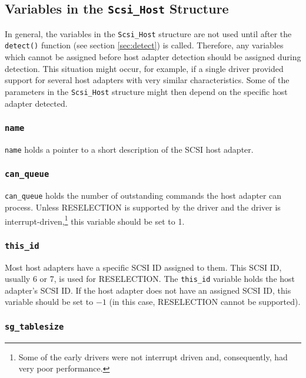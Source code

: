 \subsection{Variables in the {\tt Scsi\_Host} Structure}

In general, the variables in the \verb|Scsi_Host| structure are not used
until after the \verb|detect()| function (see section \ref{sec:detect}) is
called.  Therefore, any variables which cannot be assigned before host
adapter detection should be assigned during detection.  This situation
might occur, for example, if a single driver provided support for several
host adapters with very similar characteristics.  Some of the parameters in
the \verb|Scsi_Host| structure might then depend on the specific host
adapter detected.


\subsubsection{{\tt name}}

\verb|name| holds a pointer to a short description of the SCSI host adapter.


\subsubsection{{\tt can\_queue}}
\label{sec:can.queue}

\verb|can_queue| holds the number of outstanding commands the host adapter
can process.  Unless RESELECTION is supported by the driver and the driver
is interrupt-driven,\footnote{Some of the early \Linux{} drivers were not
  interrupt driven and, consequently, had very poor performance.} this
variable should be set to 1.

\subsubsection{{\tt this\_id}}

Most host adapters have a specific SCSI ID assigned to them.  This SCSI ID,
usually 6 or 7, is used for RESELECTION\@.  The \verb|this_id| variable
holds the host adapter's SCSI ID.  If the host adapter does not have an
assigned SCSI ID, this variable should be set to $-1$ (in this case,
RESELECTION cannot be supported).



\subsubsection{{\tt sg\_tablesize}}


